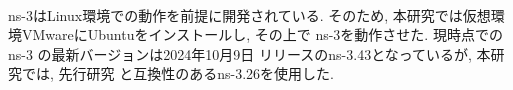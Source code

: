 \\[0.5em]
\indent ns-3はLinux環境での動作を前提に開発されている. そのため, 
本研究では仮想環境VMwareにUbuntuをインストールし, その上で
ns-3を動作させた. 現時点での ns-3 の最新バージョンは2024年10月9日
リリースのns-3.43となっているが, 本研究では, 先行研究
\cite{shinato}と互換性のあるns-3.26を使用した. \\[2em]